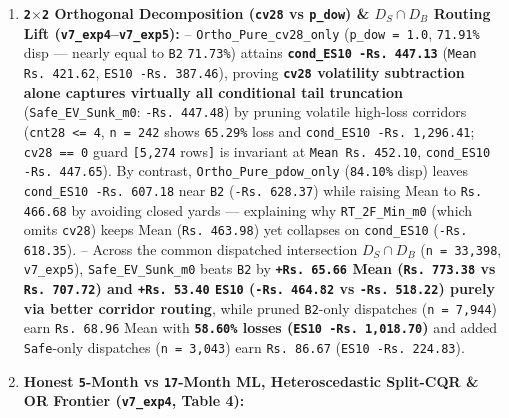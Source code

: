 \documentclass[11pt,a4paper]{article}
\begin{document}
\begin{enumerate}
  \item \textbf{\texttt{2$\times$2} Orthogonal Decomposition (\texttt{cv28} vs \texttt{p\_dow}) \& $D_S \cap D_B$ Routing Lift (\texttt{v7\_exp4}--\texttt{v7\_exp5}):}  -- \texttt{Ortho\_Pure\_cv28\_only} (\texttt{p\_dow = 1.0}, \texttt{71.91\%} disp --- nearly equal to \texttt{B2} \texttt{71.73\%}) attains \textbf{\texttt{cond\_ES10 -Rs.\,447.13}} (\texttt{Mean Rs.\,421.62}, \texttt{ES10 -Rs.\,387.46}), proving \textbf{\texttt{cv28} volatility subtraction alone captures virtually all conditional tail truncation} (\texttt{Safe\_EV\_Sunk\_m0}: \texttt{-Rs.\,447.48}) by pruning volatile high-loss corridors (\texttt{cnt28 <= 4}, \texttt{n = 242} shows \texttt{65.29\%} loss and \texttt{cond\_ES10 -Rs.\,1,296.41}; \texttt{cv28 == 0} guard \texttt{[5,274} rows\texttt{]} is invariant at \texttt{Mean Rs.\,452.10}, \texttt{cond\_ES10 -Rs.\,447.65}). By contrast, \texttt{Ortho\_Pure\_pdow\_only} (\texttt{84.10\%} disp) leaves \texttt{cond\_ES10 -Rs.\,607.18} near \texttt{B2} (\texttt{-Rs.\,628.37}) while raising Mean to \texttt{Rs.\,466.68} by avoiding closed yards --- explaining why \texttt{RT\_2F\_Min\_m0} (which omits \texttt{cv28}) keeps Mean (\texttt{Rs.\,463.98}) yet collapses on \texttt{cond\_ES10} (\texttt{-Rs.\,618.35}).  -- Across the common dispatched intersection $D_S \cap D_B$ (\texttt{n = 33,398}, \texttt{v7\_exp5}), \texttt{Safe\_EV\_Sunk\_m0} beats \texttt{B2} by \textbf{\texttt{+Rs.\,65.66} Mean (\texttt{Rs.\,773.38} vs \texttt{Rs.\,707.72}) and \texttt{+Rs.\,53.40} \texttt{ES10} (\texttt{-Rs.\,464.82} vs \texttt{-Rs.\,518.22}) purely via better corridor routing}, while pruned \texttt{B2}-only dispatches (\texttt{n = 7,944}) earn \texttt{Rs.\,68.96} Mean with \textbf{\texttt{58.60\%} losses (\texttt{ES10 -Rs.\,1,018.70})} and added \texttt{Safe}-only dispatches (\texttt{n = 3,043}) earn \texttt{Rs.\,86.67} (\texttt{ES10 -Rs.\,224.83}).
  \item \textbf{Honest \texttt{5}-Month vs \texttt{17}-Month ML, Heteroscedastic Split-CQR \& OR Frontier (\texttt{v7\_exp4}, Table 4):}
\end{enumerate}
\end{document}
